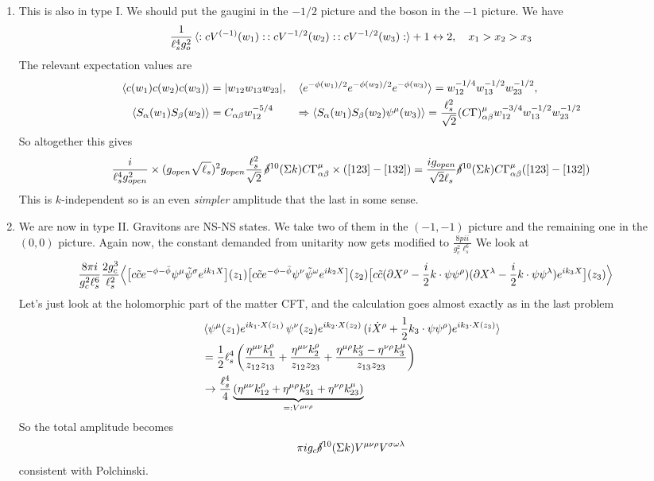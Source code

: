 \documentclass[11pt, class=article, crop=false]{standalone}
\begin{document}
\begin{enumerate}
	
	\item This is also in type I. We should put the gaugini in the $-1/2$ picture and the boson in the $-1$  picture. We have 
	\[
		\frac{1}{\ell_s^4 g_o^2} \braket{:c V^{(-1)}(w_1):\, :c V^{-1/2}(w_2):\, :c V^{-1/2}(w_3):} + 1 \leftrightarrow 2, \quad x_1 > x_2 > x_3
	\]
	The relevant expectation values are
	\[
	\begin{aligned}
		\braket{c(w_1) c(w_2) c(w_3)} &= |w_{12} w_{13} w_{23}|, \quad \braket{e^{-\phi(w_1)/2} e^{-\phi(w_2)/2} e^{-\phi(w_3)}} = w_{12}^{-1/4} w_{13}^{-1/2} w_{23}^{-1/2},\\
		\quad \braket{S_\alpha(w_1) S_\beta(w_2)} &= C_{\alpha \beta} w_{12}^{-5/4} 
		\qquad \Rightarrow \braket{S_\alpha(w_1) S_\beta(w_2) \psi^\mu(w_3)} = \frac{\ell_s^2}{\sqrt 2} (C \Gamma)^\mu_{\alpha \beta} w_{12}^{-3/4} w_{13}^{-1/2} w_{23}^{-1/2}
	\end{aligned}
	\]
	So altogether this gives 
	\[
		\frac{i}{\ell_s^4 g_{open}^2} \times (g_{open} \sqrt{\ell_s})^2 g_{open} \frac{\ell_s^2}{\sqrt 2}\, \cancel\delta^{10}(\Sigma k) C \Gamma^\mu_{\alpha \beta} \times ([123] - [132]) = \frac{i g_{open}}{\sqrt{2} \ell_s} \cancel\delta^{10}(\Sigma k) C \Gamma^\mu_{\alpha \beta} ([123] - [132])
	\]
	This is $k$-independent so is an even \emph{simpler} amplitude that the last in some sense. 
	
	\item We are now in type II. Gravitons are NS-NS states. We take two of them in the $(-1, -1)$ picture and the remaining one in the $(0, 0)$ picture. Again now, the constant demanded from unitarity now gets modified to $\frac{8 pi i}{g_c^2 \ell_s^6}$ We look at
	\[
	\begin{aligned}
		&\frac{8 \pi i}{g_{c}^2 \ell_s^6} \frac{2 g_{c}^3}{\ell_s^2} \Big< \big[c \tilde c e^{-\phi - \bar \phi} \psi^\mu \tilde \psi^\sigma e^{i k_1 X} \big] (z_1) \big[c \tilde c e^{-\phi - \bar \phi} \psi^\nu \tilde \psi^\omega e^{i k_2 X}\big] (z_2) \big[ c \tilde c(\partial X^\rho - \frac i2 k \cdot \psi \psi^\rho) (\partial X^\lambda - \frac i2 k \cdot \psi \psi^\lambda) e^{i k_3 X} \big] (z_3)\Big> 
	\end{aligned}
	\]
	Let's just look at the holomorphic part of the matter CFT, and the calculation goes almost exactly as in the last problem
	\[
	\begin{aligned}
		&\braket{\psi^\mu (z_1) e^{i k_1 \cdot X(z_1)}\, \psi^\nu (z_2) e^{i k_2 \cdot X(z_2)} \, (i \dot X^\rho + \frac12 k_3 \cdot \psi \psi^\rho) e^{i k_3 \cdot X(z_3)} } \\
		&= \frac12 \ell_s^4 \left(\frac{\eta^{\mu \nu}k_1^\rho}{z_{12} z_{13}} + \frac{\eta^{\mu \nu} k_2^\rho}{z_{12} z_{23}} + \frac{\eta^{\mu \rho} k_3^\nu - \eta^{\nu \rho} k_3^\mu}{z_{13} z_{23}} \right)\\
		& \rightarrow  \frac{\ell_s^4}{4} \underbrace{\left(\eta^{\mu \nu} k_{12}^\rho + \eta^{\mu \rho} k_{31}^\nu + \eta^{\nu \rho} k_{23}^\mu \right)}_{ =: V^{\mu \nu \rho}}
	\end{aligned}
	\]
	So the total amplitude becomes
	\[
		\pi i g_c \cancel\delta^{10}(\Sigma k) V^{\mu \nu \rho} V^{\sigma \omega \lambda}
	\]
	consistent with Polchinski.
	

\end{enumerate}
\end{document}
